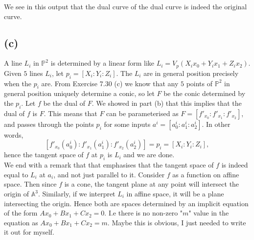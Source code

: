 \documentclass{article}
\theoremstyle{definition}
\renewcommand{\P}{\mathbb{P}}
\newcommand{\A}{\mathbb{A}}
\renewcommand{\AA}[1]{\A^{#1}}
\newcommand{\PP}[1]{\P^{#1}}
\begin{document}
We see in this output that the dual curve of the dual curve is indeed the
original curve.

\subsection*{(c)}

A line $L_i$ in $\PP{2}$ is determined by a linear form like $L_i = V_p(X_i x_0
+ Y_i x_1 + Z_i x_2)$. Given $5$ lines $L_i$, let $p_i = [X_i : Y_i : Z_i]$.
The $L_i$ are in general position precisely when the $p_i$ are. From Exercise
7.30 (c) we know that any $5$ points of $\PP{2}$ in general position uniquely
determine a conic, so let $F$ be the conic determined by the $p_i$. Let $f$ be
the dual of $F$. We showed in part (b) that this implies that the dual of $f$
is $F$. This means that $F$ can be parameterised as $F = [f'_{x_0} : f'_{x_1} :
f'_{x_2}]$, and passes through the points $p_i$ for some inputs $a^i = [a^i_0 :
a^i_1 : a^i_2]$. In other words, 
\[
	[f'_{x_0}(a^i_0) : f'_{x_1}(a^i_1) : f'_{x_2}(a^i_2)]
	=
	p_i
	=
	[X_i : Y_i : Z_i],
\]
hence the tangent space of $f$ at $p_i$ is $L_i$ and we are done. \\

We end with a remark that that emphasises that the tangent space of $f$ is
indeed equal to $L_i$ at $a_i$, and not just parallel to it. Consider $f$ as a
function on affine space. Then since $f$ is a cone, the tangent plane at any
point will intersect the origin of $\AA{3}$. Similarly, if we interpret $L_i$
in affine space, it will be a plane intersecting the origin. Hence both are
spaces determined by an implicit equation of the form $Ax_0 + Bx_1 + C x_2 =
0$. I.e there is no non-zero "$m$" value in the equation as $Ax_0 + Bx_1 + C
x_2 = m$. Maybe this is obvious, I just needed to write it out for myself. 
\end{document}
